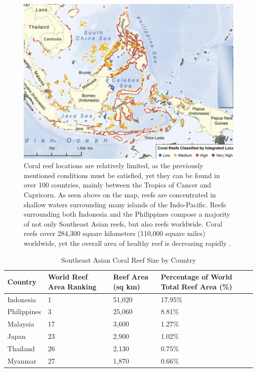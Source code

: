 \documentclass{book}\usepackage{knitr}
\begin{document}
\begin{figure}
\includegraphics[width=\linewidth]{images/reefmap}
\caption{Coral reef locations are relatively limited, as the previously mentioned conditions must be satisfied, yet they can be found in over 100 countries, mainly between the Tropics of Cancer and Capricorn. As seen above on the map, reefs are concentrated in shallow waters surrounding many islands of the Indo-Pacific. Reefs surrounding both Indonesia and the Philippines compose a majority of not only Southeast Asian reefs, but also reefs worldwide.   Coral reefs cover 284,300 square kilometers (110,000 square miles) worldwide, yet the overall area of healthy reef is decreasing rapidly \citep{Watlas}.}
\label{fig:Map of Southeast Asian Coral Reefs}
\end{figure}

\begin{table}[h]
\caption{Southeast Asian Coral Reef Size by Country}
\label{tab:Southeast Asian Coral Reef Size by Country}
\begin{tabular}{llll}
Country     & World Reef Area Ranking & Reef Area (sq km) & Percentage of World Total Reef Area (\%) \\ 
\hline\hline
Indonesia   & 1                       & 51,020            & 17.95\% \\ 
\hline
Philippines & 3                       & 25,060            & 8.81\%  \\ 
\hline
Malaysia    & 17                      & 3,600             & 1.27\%  \\ 
\hline
Japan       & 23                      & 2,900             & 1.02\%  \\ 
\hline
Thailand    & 26                      & 2,130             & 0.75\%  \\ 
\hline
Myanmar     & 27                      & 1,870             & 0.66\%  \\
\end{tabular}
\end{table}
\end{document}
